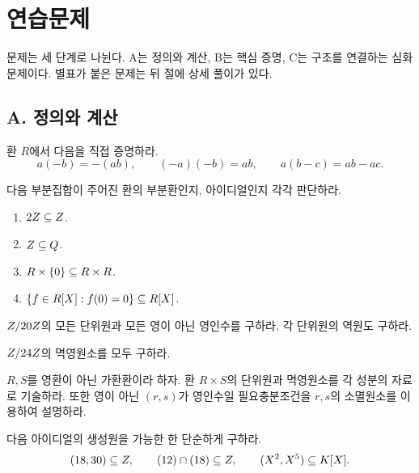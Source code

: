 \section{연습문제}
\label{sec:ring-exercises}

문제는 세 단계로 나뉜다. A는 정의와 계산, B는 핵심 증명, C는 구조를 연결하는 심화 문제이다. 별표가 붙은 문제는 뒤 절에 상세 풀이가 있다.

\subsection*{A. 정의와 계산}

\begin{exercise}
환 $R$에서 다음을 직접 증명하라.
\[
  a(-b)=-(ab),\qquad (-a)(-b)=ab,
  \qquad a(b-c)=ab-ac.
\]
\end{exercise}

\begin{exercise}
다음 부분집합이 주어진 환의 부분환인지, 아이디얼인지 각각 판단하라.
\begin{enumerate}[label=(\alph*)]
  \item $2Z\subseteq Z$.
  \item $Z\subseteq Q$.
  \item $R\times\{0\}\subseteq R\times R$.
  \item $\{f\in R[X]:f(0)=0\}\subseteq R[X]$.
\end{enumerate}
\end{exercise}

\begin{exercise}[*]
$Z/20Z$의 모든 단위원과 모든 영이 아닌 영인수를 구하라. 각 단위원의 역원도 구하라.
\end{exercise}

\begin{exercise}
$Z/24Z$의 멱영원소를 모두 구하라.
\end{exercise}

\begin{exercise}
$R,S$를 영환이 아닌 가환환이라 하자. 환 $R\times S$의 단위원과 멱영원소를 각 성분의 자료로 기술하라. 또한 영이 아닌 $(r,s)$가 영인수일 필요충분조건을 $r,s$의 소멸원소를 이용하여 설명하라.
\end{exercise}

\begin{exercise}[*]
다음 아이디얼의 생성원을 가능한 한 단순하게 구하라.
\[
 (18,30)\subseteq Z,\qquad
 (12)\cap(18)\subseteq Z,\qquad
 (X^2,X^5)\subseteq K[X].
\]
\end{exercise}

